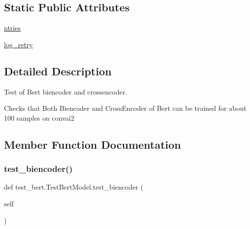 \subsection*{Static Public Attributes}
\begin{DoxyCompactItemize}
\item 
\hyperlink{classtest__bert_1_1TestBertModel_af62ecae2b9496780476aae9732a03d26}{ntries}
\item 
\hyperlink{classtest__bert_1_1TestBertModel_af6b428797cdbe20ca87f4b1379235347}{log\+\_\+retry}
\end{DoxyCompactItemize}


\subsection{Detailed Description}
\begin{DoxyVerb}Test of Bert biencoder and crossencoder.

Checks that Both Biencoder and CrossEncoder of Bert can be trained for about 100
samples on convai2
\end{DoxyVerb}
 

\subsection{Member Function Documentation}
\mbox{\label{classtest__bert_1_1TestBertModel_a58a6c62d3ef3009a203c407feea4852b}} 
\subsubsection{\texorpdfstring{test\+\_\+biencoder()}{test\_biencoder()}}
{\footnotesize\ttfamily def test\+\_\+bert.\+Test\+Bert\+Model.\+test\+\_\+biencoder (\begin{DoxyParamCaption}\item[{}]{self }\end{DoxyParamCaption})}

\mbox{\label{classtest__bert_1_1TestBertModel_a1576f491a7c638f37d3e5e3317478931}} 
